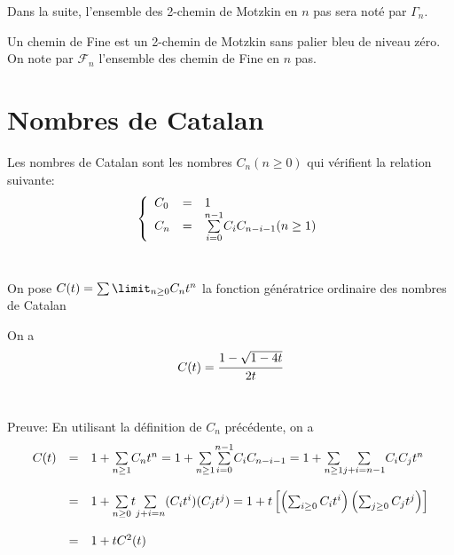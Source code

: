 Dans la suite, l'ensemble des 2-chemin de Motzkin en $n$ pas sera noté par $\Gamma_{n}$.
\vspace{5pt}
\begin{definition}
	\begin{rm}
		Un chemin de Fine est un 2-chemin de Motzkin sans palier bleu de niveau zéro. On note par $\mathcal{F}_{n}$ l'ensemble des chemin de Fine en $n$ pas.
	\end{rm}
\end{definition}

\section{Nombres de Catalan}
\begin{definition}
	\begin{rm}
		Les nombres de Catalan sont les nombres $C_{n} (n \geq 0)$ qui vérifient  la relation suivante:
		\[
			\left \{
			\begin{array}{l l l}
				C_{0} & = & 1                                                            \\
				C_{n} & = & \underset{i=0}{\overset{n-1}{\sum}}C_{i}C_{n-i-1} (n \geq 1)
			\end{array}
			\right.
		\]\vspace{5pt}\\
	\end{rm}
\end{definition}
On pose $C(t)=\sum\limit_{n\geq 0}C_{n}t^{n}$ la fonction génératrice ordinaire des nombres de Catalan
\begin{proposition}
	\begin{rm}
		On a \[C(t)=\cfrac{1-
				\sqrt{1-4t}}{2t}\]\\
	\end{rm}
\end{proposition}
Preuve: En utilisant la définition de $C_{n}$ précédente, on a\\\[
	\begin{array}{r r l}
		C(t) & =       & 1+\underset{n\geq1}{\sum}C_{n}t^n=1+ \underset{n\geq1}{\sum}\underset{i=0}{\overset{n-1}{\sum}}C_{i}C_{n-i-1} = 1+
		\underset{n\geq1}{\sum}\underset{j+i=n-1}{\sum}C_{i}C_{j}t^n                                                                        \\
		     & \text{} &                                                                                                                    \\
		     & =       & 1+\underset{n\geq0}{\sum}t\underset{j+i=n}{\sum}(C_{i}t^i)(C_{j}t^j)
		= 1 +t\left[\left(\sum_{i\geq0}C_{i}t^i\right)\left(\sum_{j\geq0}C_{j}t^j\right)\right]                                             \\
		     & \text{} &                                                                                                                    \\
		     & =       & 1+tC^2(t)
	\end{array}
\]\\
